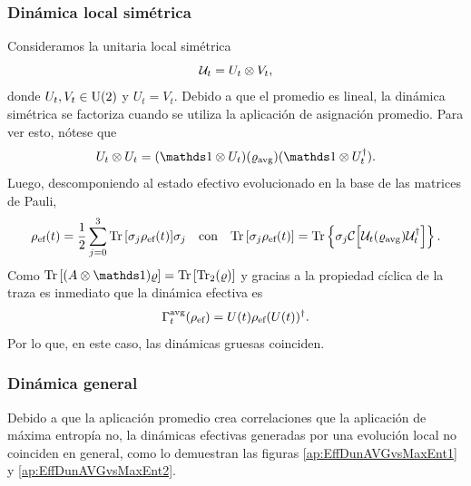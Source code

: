 \subsubsection{Dinámica local simétrica}

Consideramos la unitaria local simétrica
\begin{equation}
    \mathcal{U}_{t}=U_{t}\otimes V_{t},\nonumber
\end{equation}
donde $U_{t},V_{t}\in\text{U}(2)$ y $U_{t}=V_{t}$. Debido a que el promedio es lineal, la dinámica simétrica se factoriza cuando se utiliza la aplicación de asignación promedio. Para ver esto, nótese que
\begin{equation}
  U_{t}\otimes U_{t}=(\Id\otimes U_{t})(\varrho_{\avg})(\Id\otimes U_{t}^{\dag}).\nonumber
\end{equation}
Luego, descomponiendo al estado efectivo evolucionado en la base de las matrices de Pauli,
\begin{align}
  \rho_{\text{ef}}(t)=\frac{1}{2}\sum_{j=0}^{3}\Tr\qty[\sigma_{j}\rho_{\text{ef}}(t)]\sigma_{j} & & \text{con} & &\Tr\qty[\sigma_{j}\rho_{\text{ef}}(t)]=\Tr\left\{\sigma_{j}\mathcal{C}\qty[\mathcal{U}_{t} (\varrho_{\text{avg}}) \mathcal{U}_{t}^{\dagger}]\right\}.\nonumber
\end{align}
Como $\Tr\qty[(A\otimes \Id) \varrho]=\Tr\qty[ \Tr_{2}(\varrho)]$ y gracias a la propiedad cíclica de la traza es inmediato que la dinámica efectiva es
\begin{equation}
    \Gamma_{t}^{\text{avg}}(\rho_{\text{ef}})=U(t)\rho_{\text{ef}}(U(t))^{\dag}.\nonumber
\end{equation}
Por lo que, en este caso, las dinámicas gruesas coinciden.

\subsubsection{Dinámica general}

Debido a que la aplicación promedio crea correlaciones que la aplicación de máxima entropía no, la dinámicas efectivas generadas por una evolución local no coinciden en general, como lo demuestran las figuras \ref{ap:EffDunAVGvsMaxEnt1} y \ref{ap:EffDunAVGvsMaxEnt2}.

